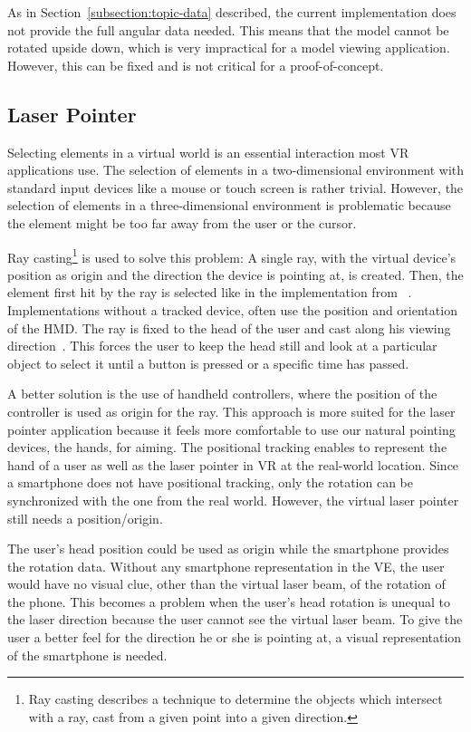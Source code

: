 As in Section~\ref{subsection:topic-data} described, the current implementation does not provide the full angular data needed. This means that the model cannot be rotated upside down, which is very impractical for a model viewing application. However, this can be fixed and is not critical for a proof-of-concept.


\subsection{Laser Pointer}\label{subsection:laser-pointer}

Selecting elements in a virtual world is an essential interaction most \gls{VR} applications use. The selection of elements in a two-dimensional environment with standard input devices like a mouse or touch screen is rather trivial. However, the selection of elements in a three-dimensional environment is problematic because the element might be too far away from the user or the cursor.

Ray casting\footnote{Ray casting describes a technique to determine the objects which intersect with a ray, cast from a given point into a given direction.} is used to solve this problem: A single ray, with the virtual device's position as origin and the direction the device is pointing at, is created. Then, the element first hit by the ray is selected like in the implementation from \citeauthor{Steed.2013}~\cite[46]{Steed.2013}. Implementations without a tracked device, often use the position and orientation of the \gls{HMD}. The ray is fixed to the head of the user and cast along his viewing direction~\cite[23]{Kamm.2018}. This forces the user to keep the head still and look at a particular object to select it until a button is pressed or a specific time has passed.

A better solution is the use of handheld controllers, where the position of the controller is used as origin for the ray. This approach is more suited for the laser pointer application because it feels more comfortable to use our natural pointing devices, the hands, for aiming. The positional tracking enables to represent the hand of a user as well as the laser pointer in \gls{VR} at the real-world location. Since a smartphone does not have positional tracking, only the rotation can be synchronized with the one from the real world. However, the virtual laser pointer still needs a position/origin.

The user's head position could be used as origin while the smartphone provides the rotation data. Without any smartphone representation in the \gls{VE}, the user would have no visual clue, other than the virtual laser beam, of the rotation of the phone. This becomes a problem when the user's head rotation is unequal to the laser direction because the user cannot see the virtual laser beam. To give the user a better feel for the direction he or she is pointing at, a visual representation of the smartphone is needed.


